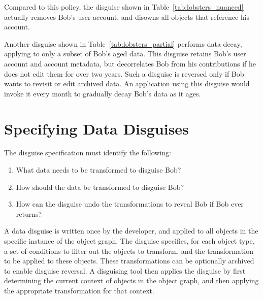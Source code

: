 Compared to this policy, the disguise shown in Table~\ref{tab:lobsters_nuanced} actually removes Bob's user
account, and disowns all objects that reference his account. 

Another disguise shown in Table~\ref{tab:lobsters_partial} performs data decay, applying to only a
subset of Bob's aged data. This disguise retains Bob's user account and account metadata, but
decorrelates Bob from his contributions if he does not edit them for over two years. Such a disguise
is reversed only if Bob wants to revisit or edit archived data.
An application using this disguise would invoke it \eg every month to gradually decay Bob's data as
it ages.

\section{Specifying Data Disguises}
\label{sec:policies}

The disguise specification must identify the following:
\begin{enumerate}
\item What data needs to be transformed to disguise Bob? 
\item How should the data be transformed to disguise Bob?
\item How can the disguise undo the transformations to reveal Bob if Bob ever returns?
\end{enumerate}

A data disguise is written once by the developer, and applied to all objects in the  
specific instance of the object graph.
%
The disguise specifies, for each object type, a set of conditions to filter out the objects to 
transform, and the transformation to be applied to these objects. These transformations can be
optionally archived to enable disguise reversal.
%
A disguising tool then applies the disguise by first determining the current context of objects in the object
graph, and then applying the appropriate transformation for that context.

